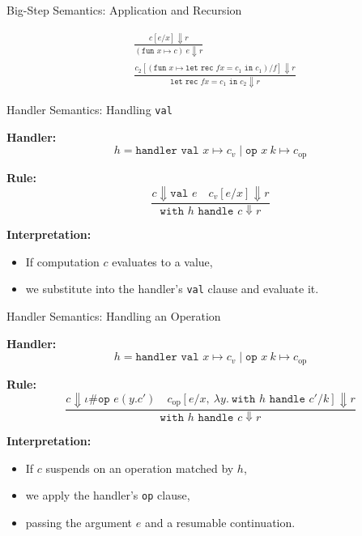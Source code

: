 \begin{frame}{Big-Step Semantics: Application and Recursion}

\begin{align*}
&\frac{c[e/x] \Downarrow r}
{(\texttt{fun } x \mapsto c)\ e \Downarrow r}
\\[1em]
&\frac{c_2[(\texttt{fun } x \mapsto \texttt{let rec } f x = c_1 \texttt{ in } c_1)/f] \Downarrow r}
{\texttt{let rec } f x = c_1 \texttt{ in } c_2 \Downarrow r}
\end{align*}
\end{frame}
\begin{frame}{Handler Semantics: Handling \texttt{val}}

\textbf{Handler:}
\[
h = \texttt{handler val } x \mapsto c_v \mid \texttt{op } x\ k \mapsto c_{\text{op}}
\]

\textbf{Rule:}
\[
\frac{c \Downarrow \texttt{val } e \quad c_v[e/x] \Downarrow r}
{\texttt{with } h \texttt{ handle } c \Downarrow r}
\]

\vspace{1em}
\textbf{Interpretation:}
\begin{itemize}
  \item If computation \( c \) evaluates to a value,
  \item we substitute into the handler's \texttt{val} clause and evaluate it.
\end{itemize}
\end{frame}
\begin{frame}{Handler Semantics: Handling an Operation}

\textbf{Handler:}
\[
h = \texttt{handler val } x \mapsto c_v \mid \texttt{op } x\ k \mapsto c_{\text{op}}
\]

\textbf{Rule:}
\[
\frac{
  c \Downarrow \iota \# \texttt{op } e (y. c') \quad
  c_{\text{op}}[e/x,\ \lambda y.\ \texttt{with } h \texttt{ handle } c'/k] \Downarrow r
}{
  \texttt{with } h \texttt{ handle } c \Downarrow r
}
\]

\vspace{1em}
\textbf{Interpretation:}
\begin{itemize}
  \item If \( c \) suspends on an operation matched by \( h \),
  \item we apply the handler’s \texttt{op} clause,
  \item passing the argument \( e \) and a resumable continuation.
\end{itemize}
\end{frame}

